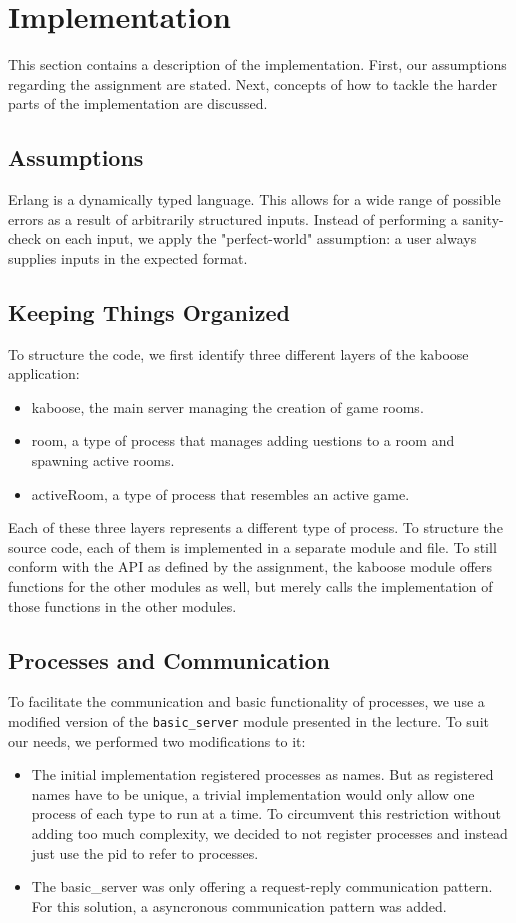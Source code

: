 \documentclass[11pt, a4paper]{article}
\begin{document}
\pagebreak
\section{Implementation}
This section contains a description of the implementation. First, our assumptions regarding the assignment are stated. Next, concepts of how to tackle the harder parts of the implementation are discussed.

\subsection{Assumptions} \label{perfect-world}
Erlang is a dynamically typed language. This allows for a wide range of possible errors as a result of arbitrarily structured inputs. Instead of performing a sanity-check on each input, we apply the "perfect-world" assumption: a user always supplies inputs in the expected format. 


\subsection{Keeping Things Organized}
To structure the code, we first identify three different layers of the kaboose application:
\begin{itemize}
	\item kaboose, the main server managing the creation of game rooms.
	\item room, a type of process that manages adding uestions to a room and spawning active rooms.
	\item activeRoom, a type of process that resembles an active game.
\end{itemize}
Each of these three layers represents a different type of process. To structure the source code, each of them is implemented in a separate module and file. To still conform with the API as defined by the assignment, the kaboose module offers functions for the other modules as well, but merely calls the implementation of those functions in the other modules.


\subsection{Processes and Communication}
To facilitate the communication and basic functionality of processes, we use a modified version of the \texttt{basic\_server} module presented in the lecture. To suit our needs, we performed two modifications to it:
\begin{itemize}
	\item The initial implementation registered processes as names. But as registered names have to be unique, a trivial implementation would only allow one process of each type to run at a time. To circumvent this restriction without adding too much complexity, we decided to not register processes and instead just use the pid to refer to processes.
	\item The basic\_server was only offering a request-reply communication pattern. For this solution, a asyncronous communication pattern was added.
\end{itemize}
\end{document}
